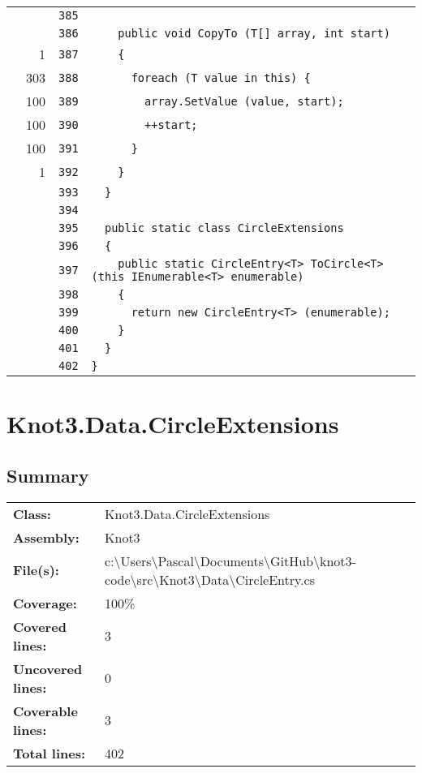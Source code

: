 \documentclass[a4paper,10pt]{article}
\begin{document}
\begin{longtable}[l]{lrrl}
\cellcolor{gray} &  & \verb~385~ & \verb~~\\
\cellcolor{gray} &  & \verb~386~ & \verb~    public void CopyTo (T[] array, int start)~\\
\cellcolor{green} & 1 & \verb~387~ & \verb~    {~\\
\cellcolor{green} & 303 & \verb~388~ & \verb~      foreach (T value in this) {~\\
\cellcolor{green} & 100 & \verb~389~ & \verb~        array.SetValue (value, start);~\\
\cellcolor{green} & 100 & \verb~390~ & \verb~        ++start;~\\
\cellcolor{green} & 100 & \verb~391~ & \verb~      }~\\
\cellcolor{green} & 1 & \verb~392~ & \verb~    }~\\
\cellcolor{gray} &  & \verb~393~ & \verb~  }~\\
\cellcolor{gray} &  & \verb~394~ & \verb~~\\
\cellcolor{gray} &  & \verb~395~ & \verb~  public static class CircleExtensions~\\
\cellcolor{gray} &  & \verb~396~ & \verb~  {~\\
\cellcolor{gray} &  & \verb~397~ & \verb~    public static CircleEntry<T> ToCircle<T> (this IEnumerable<T> enumerable)~\\
\cellcolor{gray} &  & \verb~398~ & \verb~    {~\\
\cellcolor{gray} &  & \verb~399~ & \verb~      return new CircleEntry<T> (enumerable);~\\
\cellcolor{gray} &  & \verb~400~ & \verb~    }~\\
\cellcolor{gray} &  & \verb~401~ & \verb~  }~\\
\cellcolor{gray} &  & \verb~402~ & \verb~}~\\
\end{longtable}
\newpage
\section{Knot3.Data.CircleExtensions}
\subsection{Summary}
\begin{longtable}[l]{ll}
\textbf{Class:} & Knot3.Data.CircleExtensions\\
\textbf{Assembly:} & Knot3\\
\textbf{File(s):} & \begin{minipage}[t]{12cm}{c:\textbackslash Users\textbackslash Pascal\textbackslash Documents\textbackslash GitHub\textbackslash knot3-code\textbackslash src\textbackslash Knot3\textbackslash Data\textbackslash CircleEntry.cs}\end{minipage} \\
\textbf{Coverage:} & 100\%\\
\textbf{Covered lines:} & 3\\
\textbf{Uncovered lines:} & 0\\
\textbf{Coverable lines:} & 3\\
\textbf{Total lines:} & 402\\
\end{longtable}
\end{document}
